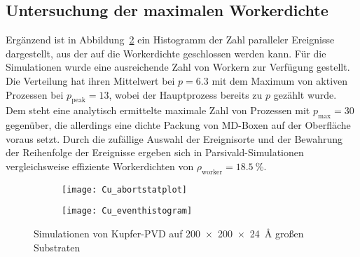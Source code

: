 \subsection{Untersuchung der maximalen Workerdichte}

Ergänzend ist in Abbildung~\ref{fig:copperworkerdensity-b} ein Histogramm der Zahl paralleler Ereignisse dargestellt, aus der auf die Workerdichte geschlossen werden kann.
Für die Simulationen wurde eine ausreichende Zahl von Workern zur Verfügung gestellt.
Die Verteilung hat ihren Mittelwert bei $p = \num{6.3}$ mit dem Maximum von aktiven Prozessen bei $p_\text{peak} = \num{13}$, wobei der Hauptprozess bereits zu $p$ gezählt wurde.
Dem steht eine analytisch ermittelte maximale Zahl von Prozessen mit $p_\text{max} = \num{30}$ gegenüber, die allerdings eine dichte Packung von MD-Boxen auf der Oberfläche voraus setzt.
Durch die zufällige Auswahl der Ereignisorte und der Bewahrung der Reihenfolge der Ereignisse ergeben sich in Parsivald-Simulationen vergleichsweise effiziente Workerdichten von $\rho_\text{worker} = \SI{18.5}{\percent}$.

\vspace{2em}

\begin{figure}[bh]

  \captionsetup[subfigure]{justification=centering,singlelinecheck=false}
  \def\subfigwidth{7cm}

  \begin{subfigure}[t]{\subfigwidth}
    \texttt{[image: Cu\_abortstatplot]}
    \label{fig:copperworkerdensity-a}
  \end{subfigure}
  \hfill
  \begin{subfigure}[t]{\subfigwidth}
    \texttt{[image: Cu\_eventhistogram]}
    \label{fig:copperworkerdensity-b}
  \end{subfigure}
  \caption{Simulationen von Kupfer-PVD auf \SI{200x200x24}{\angstrom} großen Substraten}
  \label{fig:copperworkerdensity}
\end{figure}
